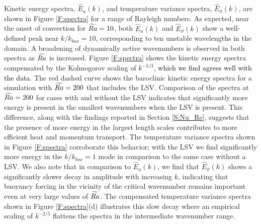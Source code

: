 Kinetic energy spectra, $\widehat{E}_u(k)$, and temperature variance spectra, $\widehat{E}_{\vartheta}(k)$, are shown in Figure \ref{F:spectra} for a range of Rayleigh numbers. 
As expected, near the onset of convection for $\widetilde{Ra} = 10$, both $\widehat{E}_u(k)$ and $\widehat{E}_{\vartheta}(k)$ show a well-defined peak near $k/k_{box}=10$, corresponding to ten unstable wavelengths in the domain.
A broadening of dynamically active wavenumbers is observed in both spectra as $\widetilde{Ra}$ is increased. 
Figure \ref{F:spectra} shows the kinetic energy spectra compensated by the Kolmogorov scaling of $k^{-5/3}$, 
\textcolor{black}{ which we find agrees well with the data.} 
The red dashed curve shows the baroclinic kinetic energy spectra for a simulation with $\widetilde{Ra} = 200$ that includes the LSV. 
Comparison of the spectra at $\widetilde{Ra} = 200$ for cases with and without the LSV indicates that significantly more energy is present in the smallest wavenumbers when the LSV is present. 
This difference, along with the findings reported in Section \ref{S:Nu_Re}, suggests that the presence of more energy in the largest length scales contributes to more efficient heat and momentum transport.
The temperature variance spectra shown in Figure \ref{F:spectra} corroborate this behavior; with the LSV we find significantly more energy in the $k/k_{box}=1$ mode in comparison to the same case without a LSV. 
We also note that in comparison to $\widehat{E}_{u}(k)$, we find that $\widehat{E}_{\vartheta}(k)$ shows a significantly slower decay in amplitude with increasing $k$, indicating that buoyancy forcing in the vicinity of the critical wavenumber remains important even at very large values of $\widetilde{Ra}$. The compensated temperature variance spectra shown in Figure \ref{F:spectra}(d) illustrates this slow decay where an empirical scaling of $k^{-2/5}$ flattens the spectra in the intermediate wavenumber range.


